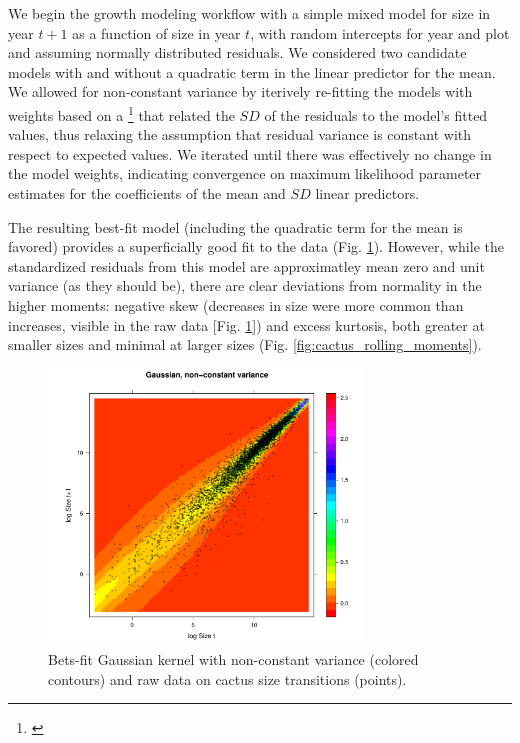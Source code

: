 \documentclass[11pt]{article}
\newcommand{\tom}[2]{{\color{red}{#1}}\footnote{\textit{\color{red}{#2}}}}
\begin{document}
{We begin the growth modeling workflow with a simple mixed model for size in year $t+1$ as a function of size in year $t$, with random intercepts for year and plot and assuming normally distributed residuals. 
We considered two candidate models with and without a quadratic term in the linear predictor for the mean.
We allowed for non-constant variance by iterively re-fitting the models with weights based on a \tom{third-order polynomial}{We came to a third-order only after working through the rest of the steps and finding some extra curvature in the sigma parameter -- not sure how much to go there. Of course, gam() would circumvent the issue entirely.} that related the $SD$ of the residuals to the model's fitted values, thus relaxing the assumption that residual variance is constant with respect to expected values. 
We iterated until there was effectively no change in the model weights, indicating convergence on maximum likelihood parameter estimates for the coefficients of the mean and $SD$ linear predictors. 

The resulting best-fit model (including the quadratic term for the mean is favored) provides a superficially good fit to the data (Fig. \ref{fig:cactus_kernel_gaussian}). 
However, while the standardized residuals from this model are approximatley mean zero and unit variance (as they should be), there are clear deviations from normality in the higher moments: negative skew (decreases in size were more common than increases, visible in the raw data [Fig. \ref{fig:cactus_kernel_gaussian}]) and excess kurtosis, both greater at smaller sizes and minimal at larger sizes (Fig. \ref{fig:cactus_rolling_moments}). 

\begin{figure}
\centering
\includegraphics[width=0.75\textwidth]{figures/cactus_kernel_gaussian}
\caption{Bets-fit Gaussian kernel with non-constant variance (colored contours) and raw data on cactus size transitions (points).}
\label{fig:cactus_kernel_gaussian}
\end{figure} 

}
\end{document}
